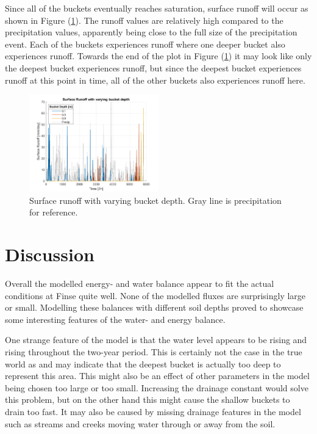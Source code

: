 \documentclass[a4paper,11pt,twocolumn]{article}
\begin{document}
Since all of the buckets eventually reaches saturation, surface runoff will occur as shown in Figure (\ref{fig:runoff}). The runoff values are relatively high compared to the precipitation values, apparently being close to the full size of the precipitation event. Each of the buckets experiences runoff where one deeper bucket also experiences runoff. Towards the end of the plot in Figure (\ref{fig:runoff}) it may look like only the deepest bucket experiences runoff, but since the deepest bucket experiences runoff at this point in time, all of the other buckets also experiences runoff here.

\begin{figure}[h]
	\centering 
	\includegraphics[width=0.5\textwidth]{figures/runoff}
	\caption{Surface runoff with varying bucket depth. Gray line is precipitation for reference.}
	\label{fig:runoff}
\end{figure} 

\section{Discussion}

Overall the modelled energy- and water balance appear to fit the actual conditions at Finse quite well. None of the modelled fluxes are surprisingly large or small. Modelling these balances with different soil depths proved to showcase some interesting features of the water- and energy balance.  

One strange feature of the model is that the water level appears to be rising and rising throughout the two-year period. This is certainly not the case in the true world as and may indicate that the deepest bucket is actually too deep to represent this area. This might also be an effect of other parameters in the model being chosen too large or too small. Increasing the drainage constant would solve this problem, but on the other hand this might cause the shallow buckets to drain too fast. It may also be caused by missing drainage features in the model such as streams and creeks moving water through or away from the soil. 
\end{document}

